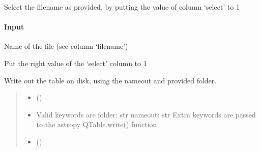 \documentclass[letterpaper,10pt,english]{sphinxmanual}
\begin{document}
\begin{fulllineitems}
\begin{fulllineitems}
\label{\detokenize{api/pymusepipe:pymusepipe.util_image.PointingTable.unselect_filename}}
\pysigstartsignatures
{}
\pysigstopsignatures
\sphinxAtStartPar
Select the filename as provided, by putting the value of column ‘select’ to 1


\paragraph{Input}
\label{\detokenize{api/pymusepipe:id136}}\begin{description}
\sphinxAtStartPar
Name of the file (see column ‘filename’)

\end{description}

\sphinxAtStartPar
Put the right value of the ‘select’ column to 1

\end{fulllineitems}


\begin{fulllineitems}
\label{\detokenize{api/pymusepipe:pymusepipe.util_image.PointingTable.write}}
\pysigstartsignatures
{}
\pysigstopsignatures
\sphinxAtStartPar
Write out the table on disk, using the nameout and provided folder.
\begin{quote}\begin{description}
\begin{itemize}
\item {} 
\sphinxAtStartPar
{} () \textendash{} 

\item {} 
\sphinxAtStartPar
{} \textendash{} Valid keywords are
folder: str
nameout: str
Extra keywords are passed to the astropy QTable.write() function

\item {} 
\sphinxAtStartPar
{} () \textendash{} 

\end{itemize}

\end{description}\end{quote}

\end{fulllineitems}


\end{fulllineitems}
\end{document}
